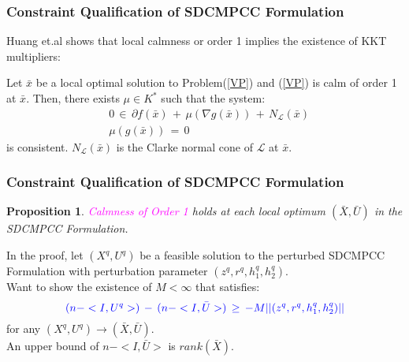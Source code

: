 \documentclass{beamer}
\newcommand{\tblue}{\textcolor{blue}}
\newcommand{\tmag}{\textcolor{magenta}}
\newtheorem{proposition}{Proposition}
\begin{document}
\begin{frame}
\frametitle{Constraint Qualification of SDCMPCC Formulation}
Huang et.al shows that local calmness or order 1 implies the existence of KKT multipliers:
\begin{theorem}
Let $\bar{x}$ be a local optimal solution to Problem(\ref{VP}) and (\ref{VP}) is calm of order 1 at $\bar{x}$. Then, there exists $\mu\in K^*$ such that the system:
\begin{equation*}
\begin{array}{ll}
&0\,\in\,\partial f(\bar{x})\,+\,\mu(\nabla g(\bar{x}))\,+\,N_{\mathcal{L}}(\bar{x})\\[0.15in]
&\mu(g(\bar{x}))\,=\,0
\end{array}
\end{equation*}
is consistent. $N_{\mathcal{L}}(\bar{x})$ is the Clarke normal cone of $\mathcal{L}$ at $\bar{x}$.
\end{theorem}

\end{frame}

\begin{frame}
\frametitle{Constraint Qualification of SDCMPCC Formulation}
\begin{proposition}
\tmag{Calmness of Order 1} holds at each local optimum $(\bar{X},\bar{U})$ in the SDCMPCC Formulation.
\end{proposition}
In the proof, let $(X^q, U^q)$ be a feasible solution to the perturbed SDCMPCC Formulation with perturbation parameter $(z^q, r^q, h_1^q, h_2^q)$.\\
\medskip
Want to show the existence of $M<\infty$ that satisfies:
\begin{displaymath}
\tblue{(n - <I, U^q>)\,-\,(n-<I,\bar{U}>)\,\geq\,-M ||(z^q, r^q, h_1^q, h_2^q)||}
\end{displaymath}
for any $(X^q, U^q)\rightarrow(\bar{X},\bar{U})$.\\
\medskip
An upper bound of $n-<I,\bar{U}>$ is $rank(\bar{X})$.
\end{frame}
\end{document}
